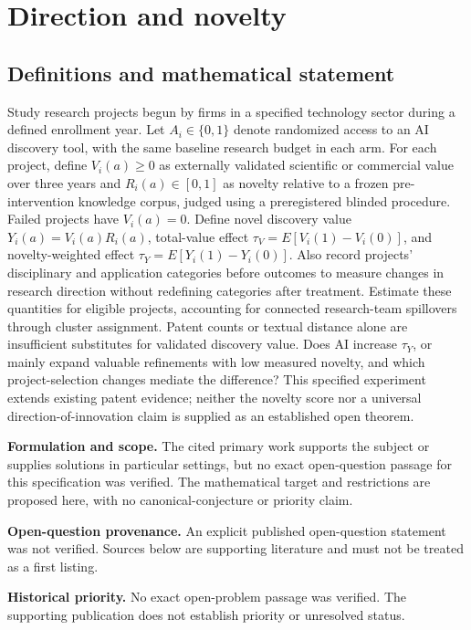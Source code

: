 \documentclass[11pt]{article}
\begin{document}
\section*{Direction and novelty}\label{30007701}
\subsection{Definitions and mathematical statement}
Study research projects begun by firms in a specified technology sector during a defined enrollment year. Let \(A_i\in\{0,1\}\) denote randomized access to an AI discovery tool, with the same baseline research budget in each arm. For each project, define \(V_i(a)\geq0\) as externally validated scientific or commercial value over three years and \(R_i(a)\in[0,1]\) as novelty relative to a frozen pre-intervention knowledge corpus, judged using a preregistered blinded procedure. Failed projects have \(V_i(a)=0\). Define novel discovery value \(Y_i(a)=V_i(a)R_i(a)\), total-value effect \(\tau_V=E[V_i(1)-V_i(0)]\), and novelty-weighted effect \(\tau_Y=E[Y_i(1)-Y_i(0)]\). Also record projects' disciplinary and application categories before outcomes to measure changes in research direction without redefining categories after treatment. Estimate these quantities for eligible projects, accounting for connected research-team spillovers through cluster assignment. Patent counts or textual distance alone are insufficient substitutes for validated discovery value. Does AI increase \(\tau_Y\), or mainly expand valuable refinements with low measured novelty, and which project-selection changes mediate the difference? This specified experiment extends existing patent evidence; neither the novelty score nor a universal direction-of-innovation claim is supplied as an established open theorem.

\par\textbf{Formulation and scope.} The cited primary work supports the subject or supplies solutions in particular settings, but no exact open-question passage for this specification was verified. The mathematical target and restrictions are proposed here, with no canonical-conjecture or priority claim.

\par\textbf{Open-question provenance.} An explicit published open-question statement was not verified. Sources below are supporting literature and must not be treated as a first listing.

\par\textbf{Historical priority.} No exact open-problem passage was verified. The supporting publication does not establish priority or unresolved status.
\end{document}
